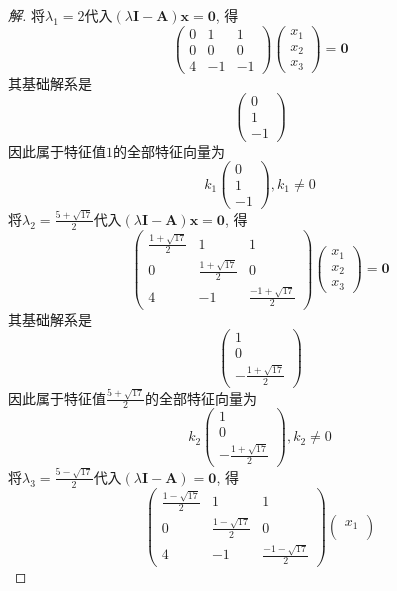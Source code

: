 \documentclass[10pt,a4paper]{report}
\def\*#1{\mathbf{#1}}
\begin{document}
\begin{proof}[解]
	将$\lambda_1 = 2$代入$(\lambda\*I - \*A)\*x = \*0$, 得
	\[ \begin{pmatrix}
	0 & 1 & 1 \\
	0 & 0 & 0 \\
	4 & -1 & -1
	\end{pmatrix}
	\begin{pmatrix}
	x_1 \\
	x_2 \\
	x_3
	\end{pmatrix} = \*0 \]
	其基础解系是
	\[ \begin{pmatrix}
	0 \\
	1 \\
	-1
	\end{pmatrix} \]
	因此属于特征值$1$的全部特征向量为
	\[ k_1 \begin{pmatrix}
	0 \\
	1 \\
	-1
	\end{pmatrix}, k_1 \neq 0 \]
	将$\lambda_2 = \frac{5+\sqrt{17}}{2}$代入$(\lambda\*I - \*A)\*x = \*0$, 得
	\[ \begin{pmatrix}
	\frac{1+\sqrt{17}}{2} & 1 & 1 \\
	0 & \frac{1+\sqrt{17}}{2} & 0 \\
	4 & -1 & \frac{-1 + \sqrt{17}}{2}
	\end{pmatrix}
	\begin{pmatrix}
	x_1 \\
	x_2 \\
	x_3
	\end{pmatrix} = \*0 \]
	其基础解系是
	\[ \begin{pmatrix}
	1 \\
	0 \\
	-\frac{1+\sqrt{17}}{2}
	\end{pmatrix} \]
	因此属于特征值$\frac{5+\sqrt{17}}{2}$的全部特征向量为
	\[ k_2 \begin{pmatrix}
	1 \\
	0 \\
	-\frac{1+\sqrt{17}}{2}
	\end{pmatrix}, k_2 \neq 0 \]
	将$\lambda_3 = \frac{5 - \sqrt{17}}{2}$代入$(\lambda\*I - \*A) = \*0$, 得
	\[ \begin{pmatrix}
	\frac{1-\sqrt{17}}{2} & 1 & 1 \\
	0 & \frac{1-\sqrt{17}}{2} & 0 \\
	4 & -1 & \frac{-1 - \sqrt{17}}{2}
	\end{pmatrix}
	\begin{pmatrix}
	x_1 \\

\end{pmatrix}\]
\end{proof}
\end{document}
